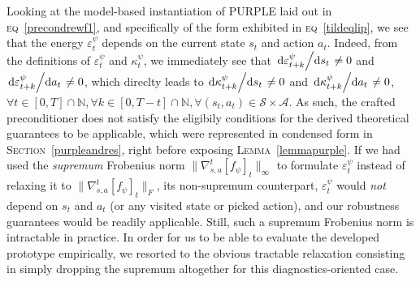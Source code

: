 Looking at the model-based instantiation of PURPLE laid out in \textsc{eq}~\ref{precondrewf1},
and specifically of the form exhibited in \textsc{eq}~\ref{tildeqlip},
we see that the energy $\varepsilon_t^\psi$ depends on the current state $s_t$ and action $a_t$.
Indeed, from the definitions of $\varepsilon_t^\psi$ and $\kappa_t^\psi$, we immediately see that
$\dv*{\varepsilon_{t+k}^\psi}{s_t} \neq 0$ and $\dv*{\varepsilon_{t+k}^\psi}{a_t} \neq 0$,
which direclty leads to
$\dv*{\kappa_{t+k}^\psi}{s_t} \neq 0$ and $\dv*{\kappa_{t+k}^\psi}{a_t} \neq 0$,
$\forall t \in [0, T] \cap \mathbb{N}, \forall k \in [0, T-t] \cap \mathbb{N},
\forall (s_t, a_t) \in \mathcal{S} \times \mathcal{A}$.
As such,
the crafted preconditioner does not satisfy the eligibily conditions
for the derived theoretical guarantees to be applicable,
which were represented in condensed form in \textsc{Section}~\ref{purpleandres},
right before exposing \textsc{Lemma}~\ref{lemmapurple}.
If we had used the \emph{supremum} Frobenius norm
$\lVert\nabla_{s,a}^t[f_\psi]_t\rVert _\infty$
to formulate $\varepsilon_t^\psi$ instead of relaxing it to
$\lVert\nabla_{s,a}^t[f_\psi]_t\rVert _F$, its non-supremum counterpart,
$\varepsilon_t^\psi$ would \emph{not} depend on $s_t$ and $a_t$ (or any visited state or picked action),
and our robustness guarantees would be readily applicable.
Still, such a supremum Frobenius norm is intractable in practice.
In order for us to be able to evaluate the developed prototype empirically,
we resorted to the obvious tractable relaxation consisting in simply dropping the supremum altogether
for this diagnostics-oriented case.

